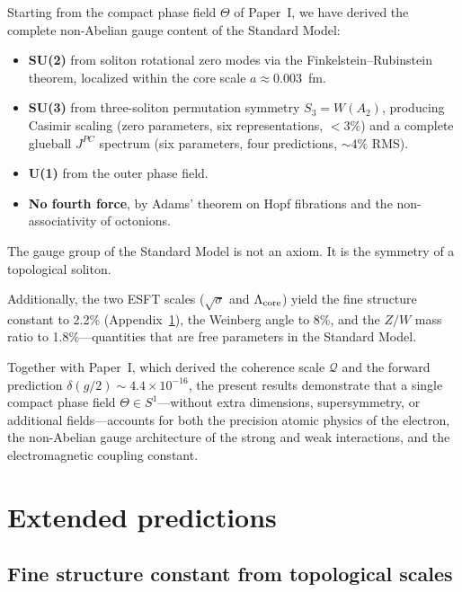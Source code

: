 \documentclass[a4paper,12pt]{article}
\newcommand{\Qoppa}{\mathcal{Q}} %
\begin{document}
Starting from the compact phase field $\Theta$ of Paper~I, we have
derived the complete non-Abelian gauge content of the Standard Model:
\begin{itemize}
 \item \textbf{SU(2)} from soliton rotational zero modes via the
 Finkelstein--Rubinstein theorem, localized within the core scale
 $a \approx 0.003$~fm.
 \item \textbf{SU(3)} from three-soliton permutation symmetry
 $S_3 = W(A_2)$, producing Casimir scaling (zero parameters,
 six representations, $<\!3\%$) and a complete glueball $J^{PC}$
 spectrum (six parameters, four predictions, $\sim\!4\%$ RMS).
 \item \textbf{U(1)} from the outer phase field.
 \item \textbf{No fourth force}, by Adams' theorem on Hopf
 fibrations and the non-associativity of octonions.
\end{itemize}

The gauge group of the Standard Model is not an axiom.
It is the symmetry of a topological soliton.

Additionally, the two ESFT scales ($\sqrt{\sigma}$ and $\Lambda_{\rm core}$)
yield the fine structure constant to 2.2\% (Appendix~\ref{sec:extended}),
the Weinberg angle to 8\%, and the $Z/W$ mass ratio to 1.8\%---quantities
that are free parameters in the Standard Model.

Together with Paper~I, which derived the coherence scale $\Qoppa$ and the
forward prediction $\delta(g/2) \sim 4.4 \times 10^{-16}$, the
present results demonstrate that a single compact phase field
$\Theta \in S^1$---without extra dimensions, supersymmetry, or
additional fields---accounts for both the precision atomic physics
of the electron, the non-Abelian gauge architecture of the
strong and weak interactions, and the electromagnetic coupling constant.

\appendix
\section{Extended predictions}
\label{sec:extended}

\subsection{Fine structure constant from topological scales}
\end{document}
